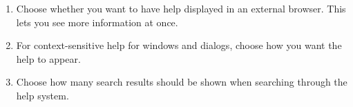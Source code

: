 
\label{helpprefs}
\begin{enumerate}
\item Choose whether you want to have help displayed in an external browser. This lets you see more information at once. 
\item For context-sensitive help for windows and dialogs, choose how you want the help to appear. 
\item Choose how many search results should be shown when searching through the help system.  
\end{enumerate}
